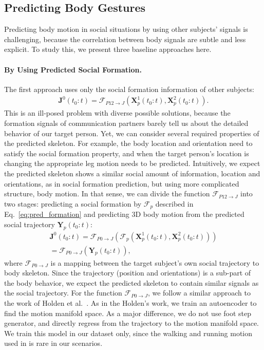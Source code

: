 \subsection{Predicting Body Gestures}
\label{section:pred_body}
Predicting body motion in social situations by using other subjects' signals is challenging, because the correlation between body signals are subtle and less explicit. To study this, we present three baseline approaches here. 

\paragraph{By Using Predicted Social Formation.} The first approach uses only the social formation information of other subjects:
\begin{gather}	
\mathbf{J}^0(t_0:t) = \mathcal{F}_{P12\rightarrow J} \left( \mathbf{X}_p^1(t_0:t), \mathbf{X}_p^2(t_0:t) \right).
\end{gather}
This is an ill-posed problem with diverse possible solutions, because the formation signals of communication partners barely tell us about the detailed behavior of our target person. Yet, we can consider several required properties of the predicted skeleton. For example, the body location and orientation need to satisfy the social formation property, and when the target person's location is changing the appropriate leg motion needs to be predicted. Intuitively, we expect the predicted skeleton shows a similar social amount of information, location and orientations, as in social formation prediction, but using more complicated structure, body motion. In that sense, we can divide the function $\mathcal{F}_{P12\rightarrow J}$ into two stages: predicting a social formation by $\mathcal{F}_p$ described in Eq.~\ref{eq:pred_formation} and predicting 3D body motion from the predicted social trajectory $\mathbf{Y}_p (t_0:t)$:
\begin{gather}	
\mathbf{J}^0 (t_0:t) = \mathcal{F}_{P0\rightarrow J} \left(   \mathcal{F}_p \left( \mathbf{X}_p^1(t_0:t), \mathbf{X}_p^2(t_0:t) \right) \right) \nonumber \\ 
= \mathcal{F}_{P0\rightarrow J} \left( \mathbf{Y}_p (t_0:t)  \right),
\label{eq:pred_p2J}
\end{gather}
where $\mathcal{F}_{P0\rightarrow J}$ is a mapping between the target subject's own social trajectory to body skeleton. Since the trajectory (position and orientations) is a sub-part of the body behavior, we expect the predicted skeleton to contain similar signals as the social trajectory. For the function $\mathcal{F}_{P0\rightarrow J}$, we follow a similar approach to the work of Holden et al.~\cite{holden2016deep}. As in the Holden's work, we train an autoencoder to find the motion manifold space. As a major difference, we do not use foot step generator, and directly regress from the trajectory to the motion manifold space. We train this model in our dataset only, since the walking and running motion used in \cite{holden2016deep} is rare in our scenarios. 

